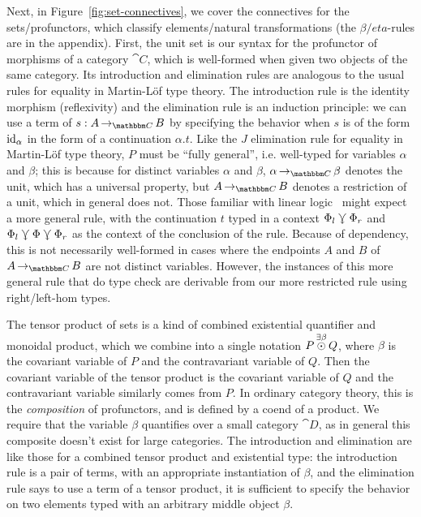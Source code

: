 \documentclass{llncs}
\begin{document}
Next, in Figure~\ref{fig:set-connectives}, we cover the connectives for
the sets/profunctors, which classify elements/natural transformations
(the $\beta/eta$-rules are in the appendix).
First, the unit set is our syntax for the profunctor of morphisms of a
category $\cat C$, which is well-formed when given two objects of the
same category.  
%
Its introduction and elimination rules are analogous to the usual rules
for equality in Martin-L\"of type theory.  The introduction rule is the
identity morphism (reflexivity) and the elimination rule is an induction
principle: we can use a term of $s : \punitinXfromYtoZ {\cat C} A B$ by
specifying the behavior when $s$ is of the form $\textrm{id}_{\alpha}$ in
the form of a continuation $\alpha. t$.  Like the $J$ elimination rule
for equality in Martin-L\"of type theory, $P$ must be ``fully general'',
i.e. well-typed for variables $\alpha$ and $\beta$; this is because for
distinct variables $\alpha$ and $\beta$, $\punitinXfromYtoZ{\cat
  C}{\alpha}{\beta}$ denotes the unit, which has a universal property,
but $\punitinXfromYtoZ{\cat C} A B$ denotes a restriction of a unit,
which in general does not.  Those familiar with linear
logic~\cite{polakawpfenning} might expect a more general rule, with the
continuation $t$ typed in a context $\Phi_l \curlyveedownarrow \Phi_r$ and $\Phi_l
\curlyveedownarrow \Phi \curlyveedownarrow \Phi_r$ as the context of the conclusion of the rule.
Because of dependency, this is not necessarily well-formed in cases
where the endpoints $A$ and $B$ of $\punitinXfromYtoZ{\cat C} A B$ are
not distinct variables.  However, the instances of this more general
rule that do type check are derivable from our more restricted rule
using right/left-hom types.

The tensor product of sets is a kind of combined existential quantifier
and monoidal product, which we combine into a single notation
$P \mathop{\overset{\exists \beta}\odot} Q$, where $\beta$ is the covariant
variable of $P$ and the contravariant variable of $Q$. Then the
covariant variable of the tensor product is the covariant variable of
$Q$ and the contravariant variable similarly comes from $P$.
%
In ordinary category theory, this is the \emph{composition} of
profunctors, and is defined by a coend of a product. We require that
the variable $\beta$ quantifies over a small category $\cat D$, as in
general this composite doesn't exist for large categories.
%
The introduction and elimination are like those for a combined tensor
product and existential type: the introduction rule is a pair of
terms, with an appropriate instantiation of $\beta$, and the
elimination rule says to use a term of a tensor product, it is
sufficient to specify the behavior on two elements typed with an
arbitrary middle object $\beta$.
\end{document}
